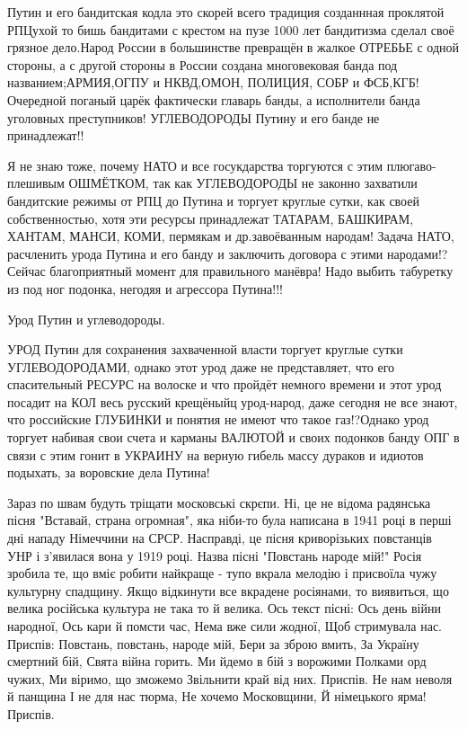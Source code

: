 Путин и его бандитская кодла это скорей всего традиция созданнная проклятой
РПЦухой то бишь бандитами с крестом на пузе 1000 лет бандитизма сделал своё
грязное дело.Народ России в большинстве превращён в жалкое ОТРЕБЬЕ с одной
стороны, а с другой стороны в России создана многовековая банда под
названием;АРМИЯ,ОГПУ и НКВД,ОМОН, ПОЛИЦИЯ, СОБР и ФСБ,КГБ! Очередной поганый
царёк фактически главарь банды, а исполнители банда уголовных преступников!
УГЛЕВОДОРОДЫ Путину и его банде не принадлежат!!

Я не знаю тоже, почему НАТО и все госукдарства торгуются с этим
плюгаво-плешивым ОШМЁТКОМ, так как УГЛЕВОДОРОДЫ не законно захватили бандитские
режимы от РПЦ до Путина и торгует круглые сутки, как своей собственностью, хотя
эти ресурсы принадлежат ТАТАРАМ, БАШКИРАМ, ХАНТАМ, МАНСИ, КОМИ, пермякам и
др.завоёванным народам! Задача НАТО, расчленить урода Путина и его банду и
заключить договора с этими народами!? Сейчас благоприятный момент для
правильного манёвра! Надо выбить табуретку из под ног подонка, негодяя и
агрессора Путина!!!

Урод Путин и углеводороды.

УРОД Путин для сохранения захваченной власти торгует круглые сутки
УГЛЕВОДОРОДАМИ, однако этот урод даже не представляет, что его спасительный
РЕСУРС на волоске и что пройдёт немного времени и этот урод посадит на КОЛ весь
русский крещёныйц урод-народ, даже сегодня не все знают, что российские
ГЛУБИНКИ и понятия не имеют что такое газ!?Однако урод торгует набивая свои
счета и карманы ВАЛЮТОЙ и своих подонков банду ОПГ в связи с этим гонит в
УКРАИНУ на верную гибель массу дураков и идиотов подыхать, за воровские дела
Путина!

Зараз по швам будуть тріщати московські скрєпи.
Ні, це не відома радянська пісня "Вставай, страна огромная", яка ніби-то була написана в 1941 році в перші дні нападу Німеччини на СРСР. Насправді, це пісня криворізьких повстанців УНР і з'явилася вона у 1919 році. Назва пісні "Повстань народе мій!"
Росія зробила те, що вміє робити найкраще - тупо вкрала мелодію і присвоїла чужу культурну спадщину.
Якщо відкинути все вкрадене росіянами, то виявиться, що велика російська культура не така то й велика.
Ось текст пісні:
Ось день війни народної,
Ось кари й помсти час,
Нема вже сили жодної,
Щоб стримувала нас.
Приспів:
Повстань, повстань, народе мій,
Бери за зброю вмить,
За Україну смертний бій,
Свята війна горить.
Ми йдемо в бій з ворожими
Полками орд чужих,
Ми віримо, що зможемо
Звільнити край від них.
Приспів.
Не нам неволя й панщина
І не для нас тюрма,
Не хочемо Московщини,
Й німецького ярма!
Приспів.

